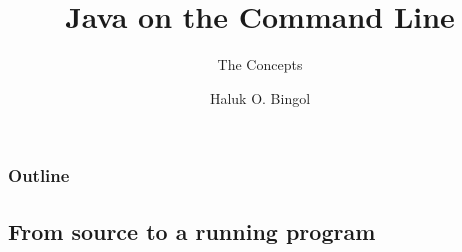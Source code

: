 \documentclass[aspectratio=169,10pt,compress]{beamer}
\title{Java on the Command Line}
\subtitle{The Concepts}
\author[Bingol]{Haluk O. Bingol}
\institute[FCIS]{
    Faculty of Computer and Information Sciences\\
    Yeditepe University
}
\date{
	{\tiny \hbTimeStamp}
}
\begin{document}
\begin{frame}[t,fragile]
  \titlepage
\end{frame}




\begin{frame}[t,fragile] \frametitle{Outline}
  \tableofcontents[hideallsubsections]
\end{frame}


\subsection[Pipeline]{From source to a running program}
\end{document}
